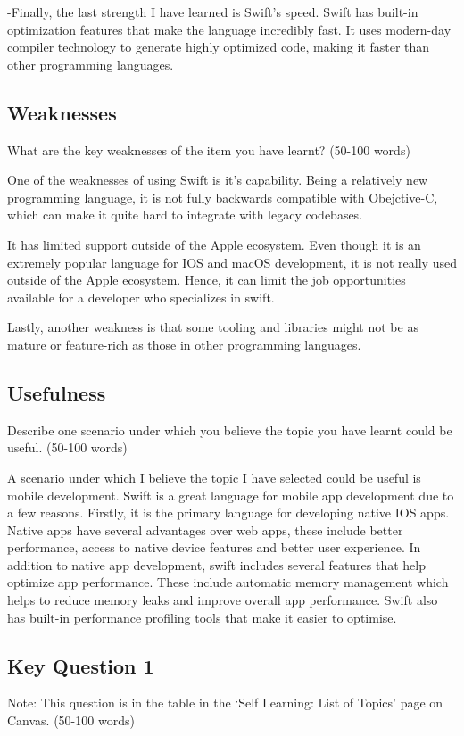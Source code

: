 \documentclass[a4paper, 11pt]{report}
\begin{document}
-Finally, the last strength I have learned is Swift’s speed. Swift has built-in optimization features that make the language incredibly fast. It uses modern-day compiler technology to generate highly optimized code, making it faster than other programming languages.


\subsection{Weaknesses}
What are the key weaknesses of the item you have learnt? (50-100 words)

One of the weaknesses of using Swift is it’s capability. Being a relatively new programming language, it is not fully backwards compatible with Obejctive-C, which can make it quite hard to integrate with legacy codebases.

It has limited support outside of the Apple ecosystem. Even though it is an extremely popular language for IOS and macOS development, it is not really used outside of the Apple ecosystem. Hence, it can limit the job opportunities available for a developer who specializes in swift.

Lastly, another weakness is that some tooling and libraries might not be as mature or feature-rich as those in other programming languages.


\subsection{Usefulness}
Describe one scenario under which you believe the topic you have learnt could be useful. (50-100 words)

A scenario under which I believe the topic I have selected could be useful is mobile development. Swift is a great language for mobile app development due to a few reasons. Firstly, it is the primary language for developing native IOS apps. Native apps have several advantages over web apps, these include better performance, access to native device features and better user experience. In addition to native app development, swift includes several features that help optimize app performance. These include automatic memory management which helps to reduce memory leaks and improve overall app performance. Swift also has built-in performance profiling tools that make it easier to optimise.

\subsection{Key Question 1}
Note: This question is in the table in the ‘Self Learning: List of Topics’ page on Canvas. (50-100 words)
\end{document}
